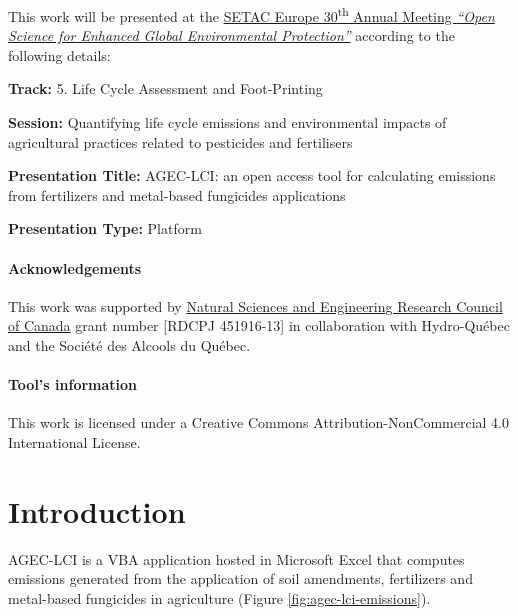 \documentclass[openany]{book}
\begin{document}
This work will be presented at the \href{https://dublin.setac.org/}{SETAC Europe 30\textsuperscript{th} Annual Meeting \emph{``Open Science for Enhanced Global Environmental Protection''}} according to the following details:

\textbf{Track:} 5. Life Cycle Assessment and Foot-Printing

\textbf{Session:} Quantifying life cycle emissions and environmental impacts of agricultural practices related to pesticides and fertilisers

\textbf{Presentation Title:} AGEC-LCI: an open access tool for calculating emissions from fertilizers and metal-based fungicides applications

\textbf{Presentation Type:} Platform

\hypertarget{acknowledgements}{%
\subsubsection*{Acknowledgements}\label{acknowledgements}}

This work was supported by \href{https://www.nserc-crsng.gc.ca/index_eng.asp}{Natural Sciences and Engineering Research Council of Canada} grant number {[}RDCPJ 451916-13{]} in collaboration with Hydro-Québec and the Société des Alcools du Québec.

\hypertarget{tools-information}{%
\subsubsection*{Tool's information}\label{tools-information}}

This work is licensed under a Creative Commons Attribution-NonCommercial 4.0 International License.

\hypertarget{introduction}{%
\chapter{Introduction}\label{introduction}}

AGEC-LCI is a VBA application hosted in Microsoft Excel that computes emissions generated from the application of soil amendments, fertilizers and metal-based fungicides in agriculture (Figure \ref{fig:agec-lci-emissions}).
\end{document}
